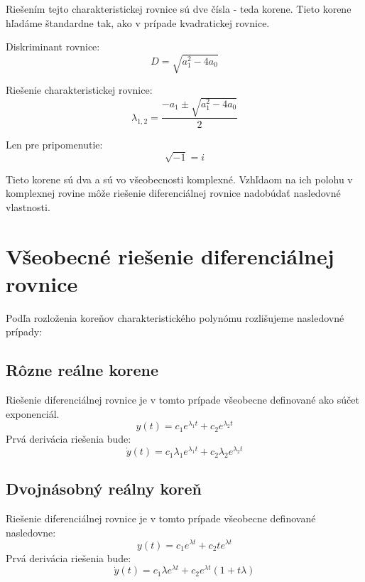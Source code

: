 \documentclass[a4paper,10pt]{article}
\begin{document}
Riešením tejto charakteristickej rovnice sú dve čísla - teda korene.
Tieto korene hľadáme štandardne tak, ako v prípade kvadratickej rovnice.

Diskriminant rovnice: 
\begin{equation}
 D=\sqrt{a_1^2-4a_0}
\end{equation}

Riešenie charakteristickej rovnice:
\label{eq:charakteristická rovnica riešenie}
\begin{equation}
 \lambda_{1,2}=\frac{-a_1\pm \sqrt{a_1^2-4a_0}}{2}
\end{equation}

Len pre pripomenutie:
\begin{equation*}
\sqrt{-1}=i
\end{equation*}

Tieto korene sú dva a sú vo všeobecnosti komplexné. 
Vzhľdaom na ich polohu v komplexnej rovine môže riešenie diferenciálnej rovnice nadobúdať nasledovné vlastnosti.

\section{Všeobecné riešenie diferenciálnej rovnice}
Podľa rozloženia koreňov charakteristického polynómu rozlišujeme nasledovné prípady:
\subsection{Rôzne reálne korene}
Riešenie diferenciálnej rovnice je v tomto prípade všeobecne definované ako súčet exponenciál.
\begin{equation}
\label{eq:riešenie reálne korene}
 y(t)=c_1e^{\lambda_1 t}+c_2e^{\lambda_2 t}
\end{equation}
Prvá derivácia riešenia bude:
\begin{equation}
\label{eq:diff riešenie reálne korene}
 \dot{y}(t)=c_1 \lambda_1 e^{\lambda_1 t}+c_2 \lambda_2 e^{\lambda_2 t}
\end{equation}

\subsection{Dvojnásobný reálny koreň}
Riešenie diferenciálnej rovnice je v tomto prípade všeobecne definované nasledovne:
\begin{equation}
\label{eq:riešenie dvojnásobný koreň}
  y(t)=c_1e^{\lambda t}+c_2 t e^{\lambda t}
\end{equation}
Prvá derivácia riešenia bude: 
\begin{equation}
\label{eq:diff riešenie dvojnásobný koreň}
 \dot{y}(t)=c_1 \lambda e^{\lambda t}+c_2e^{\lambda t} \left( 1+ t \lambda \right)
\end{equation}
\end{document}
